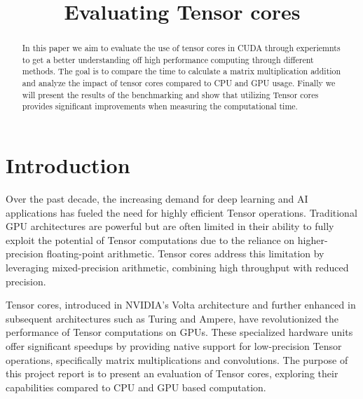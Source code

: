 \documentclass[conference]{IEEEtran}
\begin{document}
\title{Evaluating Tensor cores}


\author{
}

\maketitle

\begin{abstract}\label{sec:abstract}
In this paper we aim to evaluate the use of tensor cores in CUDA through experiemnts to get a better 
understanding off high performance computing through different methods. The goal is to compare the time 
to calculate a matrix multiplication addition and analyze the impact of tensor cores compared to CPU and GPU
usage. Finally we will present the results of the benchmarking and show that utilizing Tensor cores 
provides significant improvements when measuring the computational time.

\end{abstract}

\section{Introduction}\label{sec:intro}


Over the past decade, the increasing demand for deep learning and AI applications has
fueled the need for highly efficient Tensor operations. Traditional GPU architectures are powerful but 
are often limited in their ability to fully exploit the potential of 
Tensor computations due to the reliance on higher-precision floating-point arithmetic. 
Tensor cores address this limitation by leveraging mixed-precision arithmetic, combining 
high throughput with reduced precision.

Tensor cores, introduced in NVIDIA's Volta architecture and further enhanced in 
subsequent architectures such as Turing and Ampere, have revolutionized the performance of 
Tensor computations on GPUs. These specialized hardware units offer significant speedups 
by providing native support for low-precision Tensor operations, 
specifically matrix multiplications and convolutions. 
The purpose of this project report is to present an evaluation of Tensor cores,
exploring their capabilities compared to CPU and GPU based computation.
\end{document}
